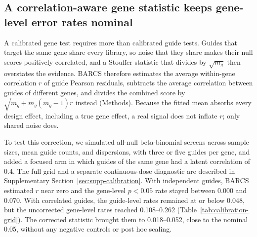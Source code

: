 \subsection{A correlation-aware gene statistic keeps gene-level error rates
nominal}
\label{sec:calibration}

A calibrated gene test requires more than calibrated guide tests.  Guides that
target the same gene share every library, so noise that they share makes
their null scores positively correlated, and a Stouffer statistic that divides
by $\sqrt{m_g}$ then overstates the evidence.  BARCS therefore estimates the
average within-gene correlation $r$ of guide Pearson residuals, subtracts the
average correlation between guides of different genes, and divides the
combined score by $\sqrt{m_g+m_g(m_g-1)r}$ instead (Methods).  Because the
fitted mean absorbs every design effect, including a true gene effect, a real
signal does not inflate $r$; only shared noise does.

To test this correction, we simulated all-null beta-binomial screens across
sample sizes, mean guide counts, and dispersions, with three or five guides
per gene, and added a focused arm in which guides of the same gene had a
latent correlation of 0.4.  The full grid and a separate continuous-dose
diagnostic are described in Supplementary Section~\ref{sec:supp-calibration}.
With independent guides, BARCS estimated $r$ near zero and the gene-level
$p<0.05$ rate stayed between 0.000 and 0.070.  With correlated guides, the
guide-level rates remained at or below 0.048, but the uncorrected gene-level
rates reached 0.108--0.262 (Table~\ref{tab:calibration-grid}).  The corrected
statistic brought them to 0.018--0.052, close to the nominal 0.05, without any
negative controls or post hoc scaling.

